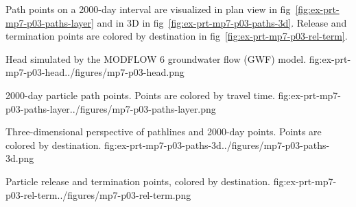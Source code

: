 Path points on a 2000-day interval are visualized in plan view in fig~\ref{fig:ex-prt-mp7-p03-paths-layer} and in 3D in fig~\ref{fig:ex-prt-mp7-p03-paths-3d}. Release and termination points are colored by destination in fig~\ref{fig:ex-prt-mp7-p03-rel-term}.

\begin{StandardFigure}{
    Head simulated by the MODFLOW 6 groundwater flow (GWF) model.
    }{fig:ex-prt-mp7-p03-head}{../figures/mp7-p03-head.png}
\end{StandardFigure}

\begin{StandardFigure}{
    2000-day particle path points. Points are colored by travel time.
    }{fig:ex-prt-mp7-p03-paths-layer}{../figures/mp7-p03-paths-layer.png}
\end{StandardFigure}

\begin{StandardFigure}{
    Three-dimensional perspective of pathlines and 2000-day points. Points are colored by destination.
    }{fig:ex-prt-mp7-p03-paths-3d}{../figures/mp7-p03-paths-3d.png}
\end{StandardFigure}

\begin{StandardFigure}{
    Particle release and termination points, colored by destination.
    }{fig:ex-prt-mp7-p03-rel-term}{../figures/mp7-p03-rel-term.png}
\end{StandardFigure}